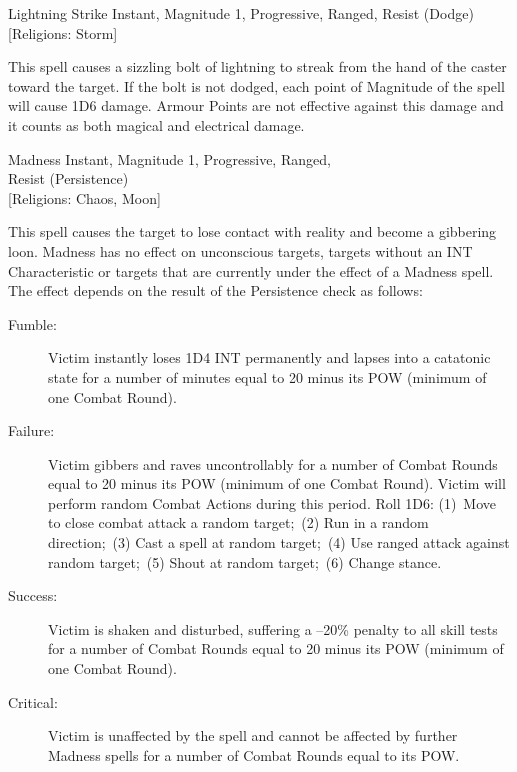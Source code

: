 \begin{rpg-spell}
{Lightning Strike}
{Instant, Magnitude 1, Progressive, Ranged, Resist (Dodge)\\{[Religions: Storm]}}

This spell causes a sizzling bolt of lightning to streak from the hand of the caster toward the target. If the bolt is not dodged, each point of Magnitude of the spell will cause 1D6 damage. Armour Points are not effective against this damage and it counts as both magical and electrical damage.
\end{rpg-spell}

\begin{rpg-spell}
{Madness}
{Instant, Magnitude 1, Progressive, Ranged,\\Resist (Persistence)\\{[Religions: Chaos, Moon]}}

This spell causes the target to lose contact with reality and become a gibbering loon. Madness has no effect on unconscious targets, targets without an INT Characteristic or targets that are currently under the effect of a Madness spell. The effect depends on the result of the Persistence check as follows:
\begin{description}
\item[Fumble:] Victim instantly loses 1D4 INT permanently and lapses into a catatonic state for a number of minutes equal to 20 minus its POW (minimum of one Combat Round). 
\item[Failure:] Victim gibbers and raves uncontrollably for a number of Combat Rounds equal to 20 minus its POW (minimum of one Combat Round). Victim will perform random Combat Actions during this period. Roll 1D6: (1) Move to close combat attack a random target; (2) Run in a random direction; (3) Cast a spell at random target; (4) Use ranged attack against random target; (5) Shout at random target; (6) Change stance. 
\item[Success:] Victim is shaken and disturbed, suffering a –20\% penalty to all skill tests for a number of Combat Rounds equal to 20 minus its POW (minimum of one Combat Round).
\item[Critical:] Victim is unaffected by the spell and cannot be affected by further Madness spells for a number of Combat Rounds equal to its POW.
\end{description}

\end{rpg-spell}

